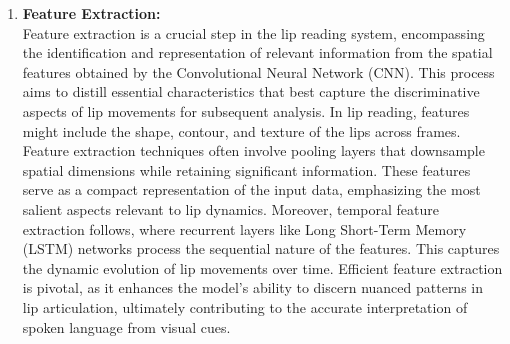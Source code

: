 \begin{enumerate}
\begin{figure}[h]
	\end{figure}
	\item \textbf{Feature Extraction:}
	\\Feature extraction is a crucial step in the lip reading system, encompassing the identification and representation of relevant information from the spatial features obtained by the Convolutional Neural Network (CNN). This process aims to distill essential characteristics that best capture the discriminative aspects of lip movements for subsequent analysis.
In lip reading, features might include the shape, contour, and texture of the lips across frames. Feature extraction techniques often involve pooling layers that downsample spatial dimensions while retaining significant information. These features serve as a compact representation of the input data, emphasizing the most salient aspects relevant to lip dynamics. Moreover, temporal feature extraction follows, where recurrent layers like Long Short-Term Memory (LSTM) networks process the sequential nature of the features. This captures the dynamic evolution of lip movements over time. Efficient feature extraction is pivotal, as it enhances the model's ability to discern nuanced patterns in lip articulation, ultimately contributing to the accurate interpretation of spoken language from visual cues.
    

\end{enumerate}

